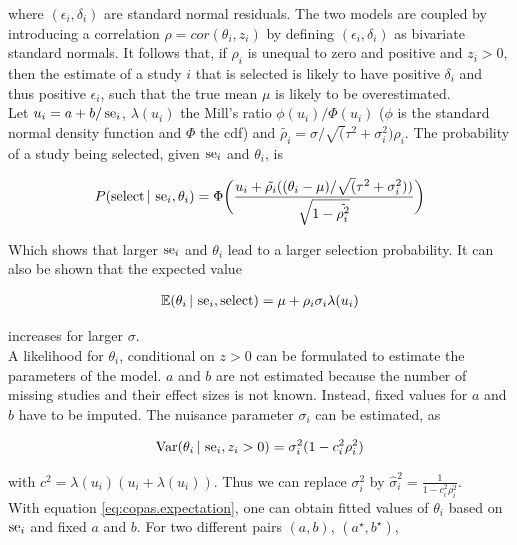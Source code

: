 \documentclass[11pt,a4paper,twoside]{book}\usepackage[]{graphicx}\usepackage[]{color}
\begin{document}
where $(\epsilon_i, \delta_i)$ are standard normal residuals. The two models are coupled by introducing a correlation $\rho = cor(\theta_i, z_i)$ by defining $(\epsilon_i, \delta_i)$ as bivariate standard normals. It follows that,
if $\rho_i$ is unequal to zero and positive and $z_i > 0$, then the estimate of a study $i$ that is selected is likely to have positive $\delta_i$ and thus positive $\epsilon_i$, such that the true mean $\mu$ is likely to be overestimated. \\
Let $u_i = a + b/\operatorname{se}_i$, $\lambda(u_i)$ the Mill's ratio $\phi(u_i)/\Phi(u_i)$ ($\phi$ is the standard normal density function and $\Phi$ the cdf) and $\tilde{\rho_i} = \sigma/\sqrt(\tau^2 + \sigma_i^2) \rho_i$. The probability of a study being selected, given $\operatorname{se}_i$ and $\theta_i$, is

\begin{align}
P(\textrm{select} \given \se_i, \theta_i) = %
\Phi\bigg(\frac{u_i + \tilde{\rho_i}((\theta_i - \mu)/\sqrt(\tau^2 + \sigma_i^2))}{\sqrt{1 - \tilde{\rho_i^2}}}\bigg) \nonumber
\end{align}

Which shows that larger $\operatorname{se}_i$ and $\theta_i$ lead to a larger selection probability. It can also be shown that the expected value 

\begin{align}
\mathbb{E}(\theta_i \,\vert\, \operatorname{se}_i, \textrm{select}) = \mu + \rho_i\sigma_i\lambda(u_i) \label{eq:copas.expectation}
\end{align}

increases for larger $\sigma$.\\
A likelihood for $\theta_i$, conditional on $z>0$ can be formulated to estimate the parameters of the model. $a$ and $b$ are not estimated because the number of missing studies and their effect sizes is not known. Instead, fixed values for $a$ and $b$ have to be imputed.
The nuisance parameter $\sigma_i$ can be estimated, as

\begin{align}
\textrm{Var}(\theta_i\,\vert\, \operatorname{se}_i, z_i > 0) = \sigma_i^2 (1 - c_i^2\rho_i^2) \nonumber
\end{align}

with $c^2 = \lambda(u_i)(u_i + \lambda(u_i))$. Thus we can replace $\sigma_i^2$ by $\hat{\sigma}_i^2 = \frac{1}{1-c_i^2\rho_i^2}$. \\ 
With equation \eqref{eq:copas.expectation}, one can obtain fitted values of $\theta_i$ based on $\operatorname{se}_i$ and fixed $a$ and $b$. For two different pairs $(a,b)$, $(a^\star, b^\star)$,
\end{document}
